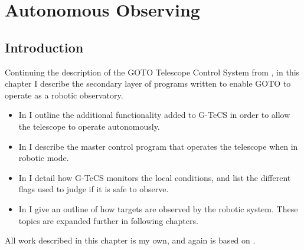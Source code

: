 \chapter{Autonomous Observing}
\label{chap:autonomous}
\chaptoc{}


\newpage
\section{Introduction}
\label{sec:autonomous_intro}
\begin{colsection}

Continuing the description of the GOTO Telescope Control System from , in this chapter I describe the secondary layer of programs written to enable GOTO to operate as a robotic observatory.
%
\begin{itemize}
    \item In  I outline the additional functionality added to G-TeCS in order to allow the telescope to operate autonomously.
    \item In  I describe the master control program that operates the telescope when in robotic mode.
    \item In  I detail how G-TeCS monitors the local conditions, and list the different flags used to judge if it is safe to observe.
    \item In  I give an outline of how targets are observed by the robotic system. These topics are expanded further in following chapters.
\end{itemize}
%
All work described in this chapter is my own, and again is based on \citet{Dyer}.

\end{colsection}


\newpage
